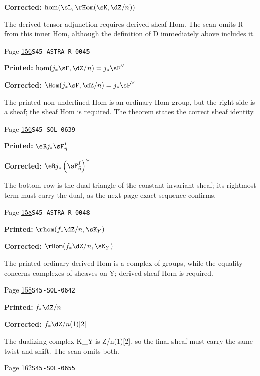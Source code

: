 \begin{description}
\par\noindent\textbf{Corrected:} \(\hom(\sL,\rHom(\sK,\dZ/n))\)
\par\noindent The derived tensor adjunction requires derived sheaf Hom. The scan omits R from this inner Hom, although the definition of D immediately above includes it.
\smallskip
\item[\hypertarget{apparatus:EN-0089}{89}] Page \hyperlink{printpage:en:156}{156}\quad\texttt{S45-ASTRA-R-0045}
\par\noindent\textbf{Printed:} \(\hom(j_\ast\sF,\dZ/n)=j_\ast\sF^\vee\)
\par\noindent\textbf{Corrected:} \(\Hom(j_\ast\sF,\dZ/n)=j_\ast\sF^\vee\)
\par\noindent The printed non-underlined Hom is an ordinary Hom group, but the right side is a sheaf; the sheaf Hom is required. The theorem states the correct sheaf identity.
\smallskip
\item[\hypertarget{apparatus:EN-0090}{90}] Page \hyperlink{printpage:en:156}{156}\quad\texttt{S45-SOL-0639}
\par\noindent\textbf{Printed:} \(\eR j_\ast \sF_{\bar\eta}^I\)
\par\noindent\textbf{Corrected:} \(\eR j_\ast\left(\sF_{\bar\eta}^I\right)^\vee\)
\par\noindent The bottom row is the dual triangle of the constant invariant sheaf; its rightmost term must carry the dual, as the next-page exact sequence confirms.
\smallskip
\item[\hypertarget{apparatus:EN-0091}{91}] Page \hyperlink{printpage:en:158}{158}\quad\texttt{S45-ASTRA-R-0048}
\par\noindent\textbf{Printed:} \(\rhom(f_\ast\dZ/n,\sK_Y)\)
\par\noindent\textbf{Corrected:} \(\rHom(f_\ast\dZ/n,\sK_Y)\)
\par\noindent The printed ordinary derived Hom is a complex of groups, while the equality concerns complexes of sheaves on Y; derived sheaf Hom is required.
\smallskip
\item[\hypertarget{apparatus:EN-0092}{92}] Page \hyperlink{printpage:en:158}{158}\quad\texttt{S45-SOL-0642}
\par\noindent\textbf{Printed:} \(f_\ast\dZ/n\)
\par\noindent\textbf{Corrected:} \(f_\ast\dZ/n(1)[2]\)
\par\noindent The dualizing complex K\_Y is Z/n(1)[2], so the final sheaf must carry the same twist and shift. The scan omits both.
\smallskip
\item[\hypertarget{apparatus:EN-0093}{93}] Page \hyperlink{printpage:en:162}{162}\quad\texttt{S45-SOL-0655}

\end{description}
